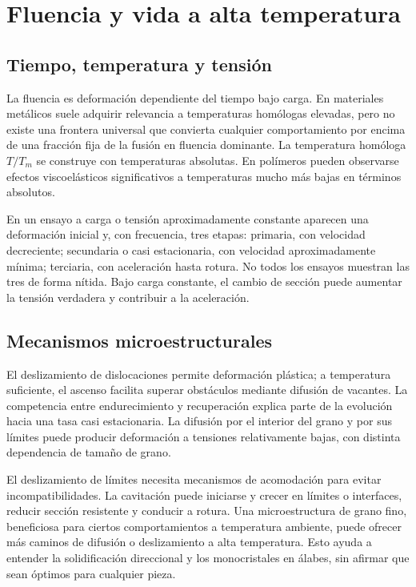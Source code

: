 \chapter{Fluencia y vida a alta temperatura}\label{ch:05}
\section{Tiempo, temperatura y tensión}
La fluencia es deformación dependiente del tiempo bajo carga. En materiales metálicos suele adquirir relevancia a temperaturas homólogas elevadas, pero no existe una frontera universal que convierta cualquier comportamiento por encima de una fracción fija de la fusión en fluencia dominante. La temperatura homóloga $T/T_m$ se construye con temperaturas absolutas. En polímeros pueden observarse efectos viscoelásticos significativos a temperaturas mucho más bajas en términos absolutos.

En un ensayo a carga o tensión aproximadamente constante aparecen una deformación inicial y, con frecuencia, tres etapas: primaria, con velocidad decreciente; secundaria o casi estacionaria, con velocidad aproximadamente mínima; terciaria, con aceleración hasta rotura. No todos los ensayos muestran las tres de forma nítida. Bajo carga constante, el cambio de sección puede aumentar la tensión verdadera y contribuir a la aceleración.
\section{Mecanismos microestructurales}
El deslizamiento de dislocaciones permite deformación plástica; a temperatura suficiente, el ascenso facilita superar obstáculos mediante difusión de vacantes. La competencia entre endurecimiento y recuperación explica parte de la evolución hacia una tasa casi estacionaria. La difusión por el interior del grano y por sus límites puede producir deformación a tensiones relativamente bajas, con distinta dependencia de tamaño de grano.

El deslizamiento de límites necesita mecanismos de acomodación para evitar incompatibilidades. La cavitación puede iniciarse y crecer en límites o interfaces, reducir sección resistente y conducir a rotura. Una microestructura de grano fino, beneficiosa para ciertos comportamientos a temperatura ambiente, puede ofrecer más caminos de difusión o deslizamiento a alta temperatura. Esto ayuda a entender la solidificación direccional y los monocristales en álabes, sin afirmar que sean óptimos para cualquier pieza.

